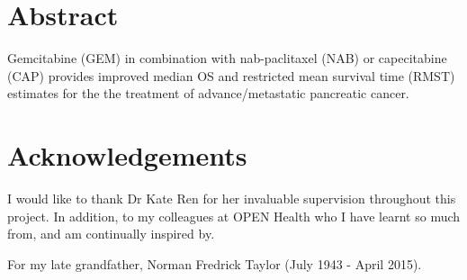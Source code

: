 \documentclass[11pt]{report}
\begin{document}


%

\section*{Abstract}
Gemcitabine (GEM) in combination with nab-paclitaxel (NAB) or capecitabine (CAP) provides improved median OS and restricted mean survival time (RMST) estimates for the the treatment of advance/metastatic pancreatic cancer. 

\section*{Acknowledgements}
I would like to thank Dr Kate Ren for her invaluable supervision throughout this project. In addition, to my colleagues at OPEN Health who I have learnt so much from, and am continually inspired by.  

\clearpage
\begin{center}
  \thispagestyle{empty}
  \vspace*{\fill}
  For my late grandfather, Norman Fredrick Taylor (July 1943 - April 2015).
  \vspace*{\fill}
\end{center}

\setcounter{tocdepth}{3}
\tableofcontents

\setcounter{tocdepth}{2}
\listoffigures
















{}

\appendix
\appendixpage








\end{document}
